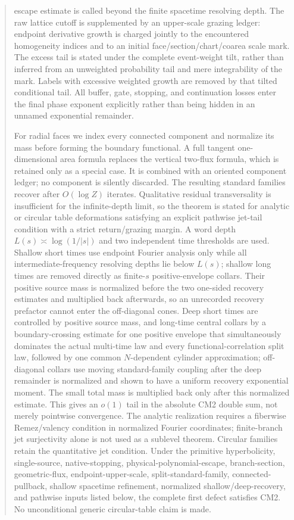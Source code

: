 \documentclass[11pt]{article}
\begin{document}
\begin{abstract}
escape estimate is called beyond the finite spacetime resolving depth.  The
raw lattice cutoff is supplemented by an upper-scale grazing ledger: endpoint
derivative growth is charged jointly to the encountered homogeneity indices
and to an initial face/section/chart/coarea scale mark.  The excess tail is
stated under the complete event-weight tilt, rather than inferred from an
unweighted probability tail and mere integrability of the mark.  Labels with
excessive weighted growth are removed by that tilted conditional tail.  All
buffer, gate, stopping, and continuation losses enter the final phase exponent
explicitly rather than being hidden in an unnamed exponential remainder.

For radial faces we index every connected component and normalize its mass
before forming the boundary functional.  A full tangent one-dimensional area
formula replaces the vertical two-flux formula, which is retained only as a
special case.  It is combined with an oriented component ledger; no component is silently
discarded.  The resulting standard families recover after $O(\log Z)$
iterates.  Qualitative residual transversality is insufficient for the
infinite-depth limit, so the theorem is stated for analytic or circular table
deformations satisfying an explicit pathwise jet-tail condition with a
strict return/grazing margin.  A word depth $L(s)\asymp\log(1/|s|)$ and two
independent time thresholds are used.  Shallow short times use endpoint
Fourier analysis only while all intermediate-frequency resolving depths lie
below $L(s)$; shallow long times are removed directly as finite-$s$
positive-envelope collars.  Their positive source mass is normalized before
the two one-sided recovery estimates and multiplied back afterwards, so an
unrecorded recovery prefactor cannot enter the off-diagonal cones.
Deep short times are controlled by positive source mass, and long-time
central collars by a boundary-crossing estimate for
one positive envelope that simultaneously dominates the actual multi-time law
and every functional-correlation split law, followed by one common
$N$-dependent cylinder approximation;
off-diagonal collars use moving standard-family coupling after the deep
remainder is normalized and shown to have a uniform recovery exponential
moment.  The small total mass is multiplied back only after this normalized
estimate.  This gives an
$o(1)$ tail in the absolute CM2 double sum, not merely pointwise convergence.
The analytic realization requires a fiberwise Remez/valency condition in
normalized Fourier coordinates; finite-branch jet surjectivity alone is not
used as a sublevel theorem.  Circular families retain the quantitative jet
condition.  Under the primitive hyperbolicity, single-source,
native-stopping, physical-polynomial-escape, branch-section, geometric-flux,
endpoint-upper-scale, split-standard-family, connected-pullback, shallow spacetime refinement,
normalized shallow/deep-recovery, and pathwise inputs
listed below, the complete first
defect satisfies CM2.  No unconditional generic circular-table claim is made.

\end{abstract}
\end{document}
